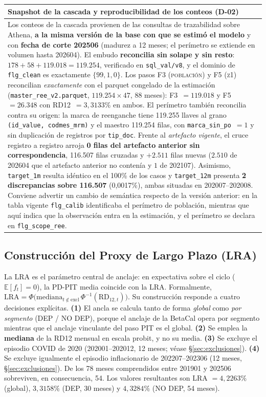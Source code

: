 \documentclass[12pt, a4paper]{article}
\newcommand{\RD}{\ensuremath{\mathrm{RD}}}
\newcommand{\LRA}{\ensuremath{\mathrm{LRA}}}
\newcommand{\ft}{\ensuremath{f_t}}
\newcommand{\Norm}{\ensuremath{\Phi}}
\newenvironment{recuadro}[1]
{\begin{center}\begin{tabular}{|p{0.92\textwidth}|}
\hline
\rowcolor{grissuave}
\textbf{#1} \\ \hline
}
{\\ \hline \end{tabular}\end{center}}
\begin{document}
\begin{recuadro}{Snapshot de la cascada y reproducibilidad de los conteos (D-02)}
Los conteos de la cascada provienen de las consultas de trazabilidad sobre Athena,
\textbf{a la misma versión de la base con que se estimó el modelo} y con \textbf{fecha de corte
202506} (madurez a 12 meses; el perímetro se extiende en volumen hasta 202604). El embudo
\textbf{reconcilia sin solape y sin resto}: $178+58+119.018=119.254$, verificado en
\texttt{sql\_val/v8}, y el dominio de \texttt{flg\_clean} es exactamente $\{99,1,0\}$. Los pasos F3
(\textsc{población}) y F5 (\textsc{z1}) reconcilian \emph{exactamente} con el parquet congelado de
la estimación (\texttt{master\_ree\_v2.parquet}, $119.254\times47$, 88 meses): F3~$=119.018$ y
F5~$=26.348$ con RD12~$=3{,}3133\%$ en ambos. El perímetro también reconcilia contra su origen: la
marca de reenganche tiene 119.255 llaves al grano \texttt{(id\_value, codmes\_mrm)} y el maestro
119.254 filas, con \texttt{marca\_sin\_po}~$=1$ y sin duplicación de registros por
\texttt{tip\_doc}. Frente al \emph{artefacto vigente}, el cruce registro a registro arroja
\textbf{0 filas del artefacto anterior sin correspondencia}, 116.507 filas cruzadas y $+2.511$
filas nuevas ($2.510$ de 202604 que el artefacto anterior no contenía y $1$ de 202107). Asimismo,
\texttt{target\_1m} resulta idéntico en el 100\% de los casos y \texttt{target\_12m} presenta
\textbf{2 discrepancias sobre 116.507} (0,0017\%), ambas situadas en 202007--202008. Conviene
advertir un cambio de semántica respecto de la versión anterior: en la tabla vigente
\texttt{flg\_calib} identificaba el perímetro de población, mientras que aquí indica que la
observación entra en la estimación, y el perímetro se declara en \texttt{flg\_scope\_ree}.
\end{recuadro}

\subsection{Construcción del Proxy de Largo Plazo (LRA)}
\label{sec:lra}
La LRA es el parámetro central de anclaje: en expectativa sobre el ciclo ($\mathbb{E}[\ft]=0$),
la PD-PIT media coincide con la LRA. Formalmente,
$\LRA=\Norm\big(\mathrm{mediana}_{t\notin\mathrm{excl}}\,\Norm^{-1}(\RD_{12,t})\big)$. Su
construcción responde a cuatro decisiones explícitas. \textbf{(1)} El ancla se calcula tanto de
forma \emph{global} como \emph{por segmento} (DEP / NO DEP), porque el anclaje de la BetaCal opera
por segmento mientras que el anclaje vinculante del paso PIT es el global. \textbf{(2)} Se emplea
la \textbf{mediana} de la RD12 mensual en escala probit, y no su media. \textbf{(3)} Se excluye el
episodio COVID de 2020 (202001--202012, 12 meses; véase \S\ref{sec:exclusiones}). \textbf{(4)} Se
excluye igualmente el episodio inflacionario de 202207--202306 (12 meses,
\S\ref{sec:exclusiones}). De los 78 meses comprendidos entre 201901 y 202506 sobreviven, en
consecuencia, 54. Los valores resultantes son LRA $= 4{,}2263\%$ (global),
$3{,}3158\%$ (DEP, 30 meses) y $4{,}3284\%$ (NO DEP, 54 meses).
\end{document}
